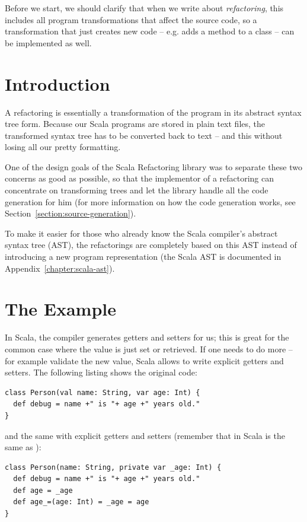 \documentclass[10pt,a4paper,oneside]{scrreprt}
\begin{document}
Before we start, we should clarify that when we write about \textit{refactoring}, this includes all program transformations that affect the source code, so a transformation that just creates new code -- e.g. adds a method to a class -- can be implemented as well.

\section{Introduction}

A refactoring is essentially a transformation of the program in its abstract syntax tree form. Because our Scala programs are stored in plain text files, the transformed syntax tree has to be converted back to text -- and this without losing all our pretty formatting. 

One of the design goals of the Scala Refactoring library was to separate these two concerns as good as possible, so that the implementor of a refactoring can concentrate on transforming trees and let the library handle all the code generation for him (for more information on how the code generation works, see Section~\vref{section:source-generation}). 

To make it easier for those who already know the Scala compiler's abstract syntax tree (AST), the refactorings are completely based on this AST instead of introducing a new program representation (the Scala AST is documented in Appendix~\vref{chapter:scala-ast}). 

\section{The Example}

In Scala, the compiler generates getters and setters for us; this is great for the common case where the value is just set or retrieved. If one needs to do more -- for example validate the new value, Scala allows to write explicit getters and setters. The following listing shows the original code:

\begin{lstlisting}
class Person(val name: String, var age: Int) {
  def debug = name +" is "+ age +" years old."
}
\end{lstlisting}

and the same with explicit getters and setters (remember that in Scala  is the same as ):

\begin{lstlisting}
class Person(name: String, private var _age: Int) {
  def debug = name +" is "+ age +" years old."
  def age = _age
  def age_=(age: Int) = _age = age
}
\end{lstlisting}
\end{document}
